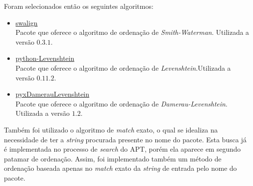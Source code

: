 Foram selecionados então os seguintes algoritmos:

\begin{itemize}
	\item \href{https://pypi.python.org/pypi/swalign/}{swalign}\\
	Pacote que oferece o algoritmo de ordenação de \textit{Smith-Waterman}. Utilizada a versão $0.3.1$.
	\item \href{https://pypi.python.org/pypi/python-Levenshtein/}{python-Levenshtein}\\
	Pacote que oferece o algoritmo de ordenação de \textit{Levenshtein}.Utilizada a versão $0.11.2$.
	\item \href{https://pypi.python.org/pypi/pyxDamerauLevenshtein/}{pyxDamerauLevenshtein}\\
	Pacote que oferece o algoritmo de ordenação de \textit{Damerau-Levenshtein}. Utilizada a versão $1.2$.
\end{itemize}

Também foi utilizado o algoritmo de \textit{match} exato, o qual se idealiza na necessidade de ter a \textit{string} procurada presente no nome do pacote. Esta busca já é implementada no processo de \textit{search} do APT, porém ela aparece em segundo patamar de ordenação. Assim, foi implementado também um método de ordenação baseada apenas no \textit{match} exato  da \textit{string} de entrada pelo nome do pacote.


